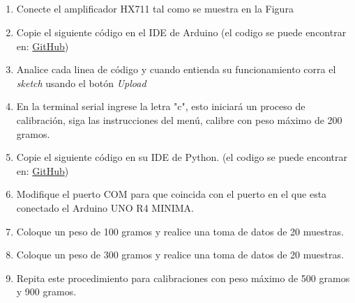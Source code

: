 \subsection{\pro}
\begin{enumerate}
    \item Conecte el amplificador HX711 tal como se muestra en la Figura %
    \item Copie el siguiente código en el IDE de Arduino (el codigo se puede encontrar en: \href{https://github.com/juanjorojash/instrumentacion_I/blob/master/code/L04/L04.ino}{GitHub})
      
    \item Analice cada linea de código y cuando entienda su funcionamiento corra el \emph{sketch} usando el botón \emph{Upload}
    \item En la terminal serial ingrese la letra "c", esto iniciará un proceso de calibración, siga las instrucciones del menú, calibre con peso máximo de 200 gramos.
    \item Copie el siguiente código en su IDE de Python. (el codigo se puede encontrar en: \href{https://github.com/juanjorojash/instrumentacion_I/blob/master/code/L04/L04.py}{GitHub})
    
    \item Modifique el puerto COM para que coincida con el puerto en el que esta conectado el Arduino UNO R4 MINIMA.
    \item Coloque un peso de 100 gramos y realice una toma de datos de 20 muestras.
    \item Coloque un peso de 300 gramos y realice una toma de datos de 20 muestras.
    \item Repita este procedimiento para calibraciones con peso máximo de 500 gramos y 900 gramos. 
\end{enumerate}

